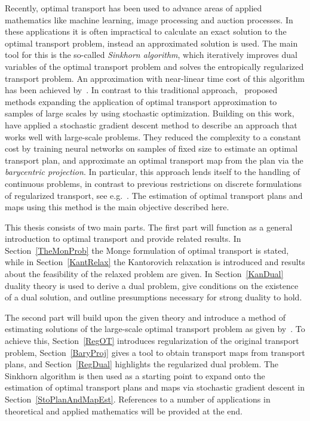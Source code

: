 Recently, optimal transport has been used to advance areas of applied mathematics like machine learning, image processing and auction processes. In these applications it is often impractical to calculate an exact solution to the optimal transport problem, instead an approximated solution is used. The main tool for this is the so-called \textit{Sinkhorn algorithm}, which iteratively improves dual variables of the optimal transport problem and solves the entropically regularized transport problem. An approximation with near-linear time cost of this algorithm has been achieved by\ \cite{Alts2019}. In contrast to this traditional approach,\ \cite{Gene2016} proposed methods expanding the application of optimal transport approximation to samples of large scales by using stochastic optimization. Building on this work,\ \cite{Seg2018} have applied a stochastic gradient descent method to describe an approach that works well with large-scale problems. They reduced the complexity to a constant cost by training neural networks on samples of fixed size to estimate an optimal transport plan, and approximate an optimal transport map from the plan via the \textit{barycentric projection}. In particular, this approach lends itself to the handling of continuous problems, in contrast to previous restrictions on discrete formulations of regularized transport, see e.g.\ \cite{Ferra2013}. The estimation of optimal transport plans and maps using this method is the main objective described here.

This thesis consists of two main parts. The first part will function as a general introduction to optimal transport and provide related results. In Section~\ref{TheMonProb} the Monge formulation of optimal transport is stated, while in Section~\ref{KantRelax} the Kantorovich relaxation is introduced and results about the feasibility of the relaxed problem are given. In Section~\ref{KanDual} duality theory is used to derive a dual problem, give conditions on the existence of a dual solution, and outline presumptions necessary for strong duality to hold.

The second part will build upon the given theory and introduce a method of estimating solutions of the large-scale optimal transport problem as given by\ \cite{Seg2018}. To achieve this, Section~\ref{RegOT} introduces regularization of the original transport problem, Section~\ref{BaryProj} gives a tool to obtain transport maps from transport plans, and Section~\ref{RegDual} highlights the regularized dual problem. The Sinkhorn algorithm is then used as a starting point to expand onto the estimation of optimal transport plans and maps via stochastic gradient descent in Section~\ref{StoPlanAndMapEst}. References to a number of applications in theoretical and applied mathematics will be provided at the end.